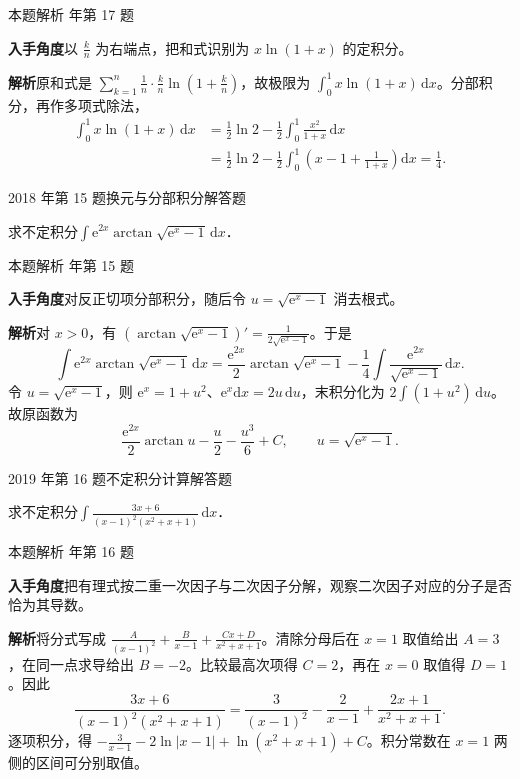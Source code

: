 \documentclass[UTF8,zihao=-4,fontset=fandol]{ctexart}
\newcommand{\QuestionPage}[6]{%
  \par\noindent\begin{minipage}{\linewidth}
  \raggedright
  {\small\textcolor{black!60}{#3\quad #5}\hfill\textcolor{accent}{#2}}\par\smallskip}
\newcommand{\QuestionEnd}{\end{minipage}\par\medskip}
\newcommand{\QuestionPage}[6]{%
  \clearpage
  {\small\textcolor{accent}{#1\hfill #2}}\par\medskip
  {\small\textcolor{black!60}{#3\quad #5\hfill #6}}\par\vspace{9bp}}
\newcommand{\QuestionEnd}{}
\newenvironment{QuestionSolution}[1]{%
  \clearpage
  {\small\textcolor{black!60}{本题解析\quad #1}}\par\medskip
}{\par\clearpage}
\begin{document}
\begin{QuestionSolution}{2017 年第 17 题}
\textbf{入手角度}\quad 以 \(\frac{k}{n}\) 为右端点，把和式识别为 \(x\ln(1+x)\) 的定积分。

\textbf{解析}\quad 原和式是 \(\sum_{k=1}^n \frac{1}{n}\cdot\frac{k}{n}\ln\!\left(1+\frac{k}{n}\right)\)，故极限为 \(\int_0^1 x\ln(1+x)\,\mathrm{d}x\)。分部积分，再作多项式除法，
\[
\begin{aligned}
\int_0^1 x\ln(1+x)\,\mathrm{d}x
&=\frac12\ln2-\frac12\int_0^1\frac{x^2}{1+x}\,\mathrm{d}x\\
&=\frac12\ln2-\frac12\int_0^1\left(x-1+\frac1{1+x}\right)\mathrm{d}x
=\boxed{\frac14}.
\end{aligned}
\]
\end{QuestionSolution}

\QuestionPage{3.3 两种基本积分法}{解答题}{2018 年第 15 题}{2}{换元与分部积分}{161 / 234}
求不定积分$\int \mathrm{e}^{2x}\arctan \sqrt{\mathrm{e}^x - 1} \,\mathrm{d} x$．
\QuestionEnd

\begin{QuestionSolution}{2018 年第 15 题}
\textbf{入手角度}\quad 对反正切项分部积分，随后令 \(u=\sqrt{\mathrm{e}^x-1}\) 消去根式。

\textbf{解析}\quad 对 \(x>0\)，有 \((\arctan\sqrt{\mathrm{e}^x-1})'=\frac{1}{2\sqrt{\mathrm{e}^x-1}}\)。于是
\[
\int \mathrm{e}^{2x}\arctan\sqrt{\mathrm{e}^x-1}\,\mathrm{d}x
=\frac{\mathrm{e}^{2x}}2\arctan\sqrt{\mathrm{e}^x-1}
-\frac14\int\frac{\mathrm{e}^{2x}}{\sqrt{\mathrm{e}^x-1}}\,\mathrm{d}x .
\]
令 \(u=\sqrt{\mathrm{e}^x-1}\)，则 \(\mathrm{e}^x=1+u^2\)、\(\mathrm{e}^x\mathrm{d}x=2u\,\mathrm{d}u\)，末积分化为 \(2\int(1+u^2)\,\mathrm{d}u\)。故原函数为
\[
\frac{\mathrm{e}^{2x}}2\arctan u-\frac u2-\frac{u^3}{6}+C,\qquad
u=\sqrt{\mathrm{e}^x-1}.
\]
\end{QuestionSolution}

\QuestionPage{3.3 两种基本积分法}{解答题}{2019 年第 16 题}{2}{不定积分计算}{162 / 234}
求不定积分$\int \frac{3x + 6}{(x - 1)^2(x^2 + x + 1)}\,\mathrm{d} x$．
\QuestionEnd

\begin{QuestionSolution}{2019 年第 16 题}
\textbf{入手角度}\quad 把有理式按二重一次因子与二次因子分解，观察二次因子对应的分子是否恰为其导数。

\textbf{解析}\quad 将分式写成 \(\frac{A}{(x-1)^2}+\frac{B}{x-1}+\frac{Cx+D}{x^2+x+1}\)。清除分母后在 \(x=1\) 取值给出 \(A=3\)，在同一点求导给出 \(B=-2\)。比较最高次项得 \(C=2\)，再在 \(x=0\) 取值得 \(D=1\)。因此
\[
\frac{3x+6}{(x-1)^2(x^2+x+1)}
=\frac3{(x-1)^2}-\frac2{x-1}+\frac{2x+1}{x^2+x+1}.
\]
逐项积分，得 \(\boxed{-\frac{3}{x-1}-2\ln|x-1|+\ln(x^2+x+1)+C}\)。积分常数在 \(x=1\) 两侧的区间可分别取值。
\end{QuestionSolution}
\end{document}
